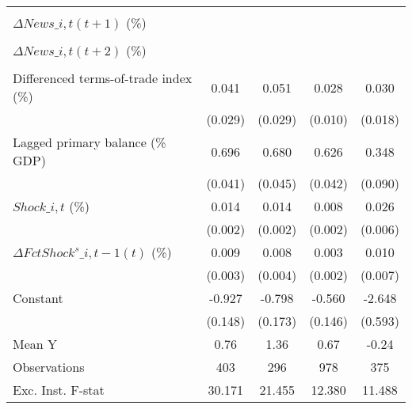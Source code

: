 {\begin{tabular}{l*{4}{c}}
                    &                     &                     &                     &                     \\
\addlinespace
$ \Delta News\_{i,t}(t+1)$ (\%)&                     &                     &                     &                     \\
                    &                     &                     &                     &                     \\
\addlinespace
$ \Delta News\_{i,t}(t+2)$ (\%)&                     &                     &                     &                     \\
                    &                     &                     &                     &                     \\
\addlinespace
Differenced terms-of-trade index (\%)&       0.041         &       0.051\sym{*}  &       0.028\sym{***}&       0.030         \\
                    &     (0.029)         &     (0.029)         &     (0.010)         &     (0.018)         \\
\addlinespace
Lagged primary balance (\% GDP)&       0.696\sym{***}&       0.680\sym{***}&       0.626\sym{***}&       0.348\sym{***}\\
                    &     (0.041)         &     (0.045)         &     (0.042)         &     (0.090)         \\
\addlinespace
$ Shock\_{i,t}$ (\%) &       0.014\sym{***}&       0.014\sym{***}&       0.008\sym{***}&       0.026\sym{***}\\
                    &     (0.002)         &     (0.002)         &     (0.002)         &     (0.006)         \\
\addlinespace
$ \Delta FctShock^s\_{i,t-1}(t)$ (\%)&       0.009\sym{**} &       0.008\sym{**} &       0.003         &       0.010         \\
                    &     (0.003)         &     (0.004)         &     (0.002)         &     (0.007)         \\
\addlinespace
Constant            &      -0.927\sym{***}&      -0.798\sym{***}&      -0.560\sym{***}&      -2.648\sym{***}\\
                    &     (0.148)         &     (0.173)         &     (0.146)         &     (0.593)         \\
\midrule
Mean Y              &        0.76         &        1.36         &        0.67         &       -0.24         \\
Observations        &         403         &         296         &         978         &         375         \\
Exc. Inst. F-stat   &      30.171         &      21.455         &      12.380         &      11.488         \\
\bottomrule
\end{tabular}
}
